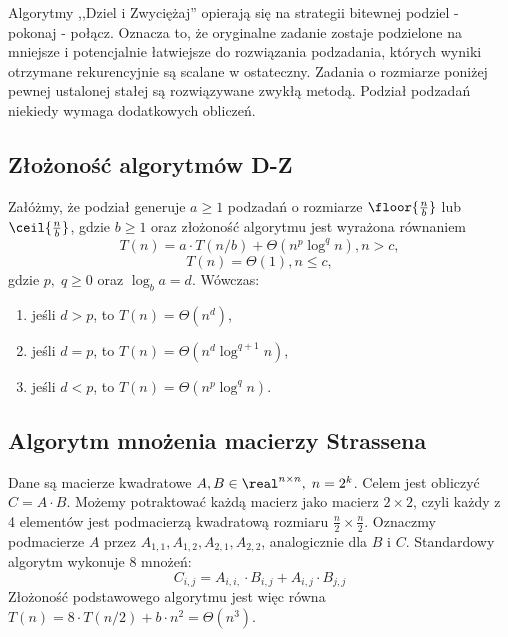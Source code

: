 Algorytmy ,,Dziel i Zwyciężaj'' opierają się na strategii bitewnej podziel - pokonaj - połącz. Oznacza to, że oryginalne zadanie zostaje
podzielone na mniejsze i potencjalnie łatwiejsze do rozwiązania podzadania, których wyniki otrzymane rekurencyjnie są scalane w ostateczny. 
Zadania o rozmiarze poniżej pewnej ustalonej stałej są rozwiązywane zwykłą metodą. Podział podzadań niekiedy wymaga dodatkowych obliczeń.

\subsection{Złożoność algorytmów D-Z}
\begin{theorem}
    Załóżmy, że podział generuje \( a \geq 1 \) podzadań o rozmiarze \( \floor{\frac{n}{b}} \) lub \( \ceil{\frac{n}{b}} \), gdzie \( b \geq 1 \)
    oraz złożoność algorytmu jest wyrażona równaniem
    \[ T(n) = a \cdot T(n/b) +\Theta(n^p \log^qn), n > c, \]
    \[ T(n) = \Theta(1), n \leq c, \]
    gdzie \( p,\; q \geq 0 \) oraz \( \log_b a = d \). Wówczas:
    \begin{enumerate}
        \item jeśli \( d > p \), to \( T(n) = \Theta(n^d) \),
        \item jeśli \( d = p \), to \( T(n) = \Theta(n^d \log^{q+1}n) \),
        \item jeśli \( d < p \), to \( T(n) = \Theta(n^p \log^qn) \).
    \end{enumerate}
\end{theorem}


\subsection{Algorytm mnożenia macierzy Strassena}
Dane są macierze kwadratowe \( A, B \in \real^{n \times n},\; n = 2^k \). Celem jest obliczyć \( C = A \cdot B \).
Możemy potraktować każdą macierz jako macierz \( 2 \times 2 \), czyli każdy z 4 elementów jest podmacierzą kwadratową rozmiaru \( \frac{n}{2} \times \frac{n}{2} \).
Oznaczmy podmacierze \( A \) przez \( A_{1,1}, A_{1,2}, A_{2,1}, A_{2,2} \), analogicznie dla \( B \) i \( C \). Standardowy algorytm wykonuje 8 mnożeń:
\[ C_{i,j} = A_{i,i,} \cdot B_{i,j} + A_{i,j} \cdot B_{j,j} \]
Złożoność podstawowego algorytmu jest więc równa \( T(n) = 8 \cdot T(n/2) + b \cdot n^2 = \Theta(n^3) \).

